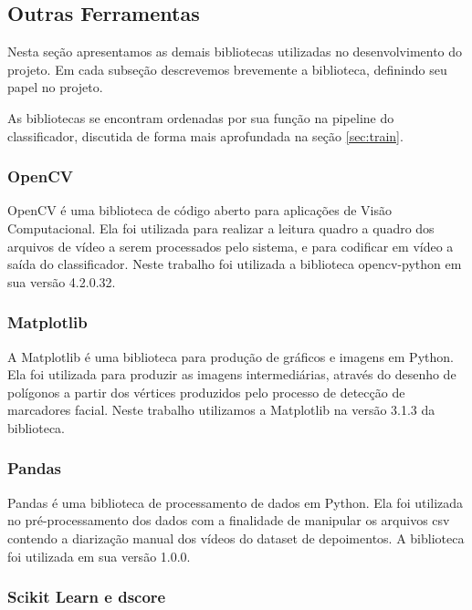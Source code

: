 \subsection{Outras Ferramentas}
\label{subsec:otools}

Nesta seção apresentamos as demais bibliotecas utilizadas no desenvolvimento do projeto. Em cada subseção descrevemos brevemente a biblioteca, definindo seu papel no projeto.

As bibliotecas se encontram ordenadas por sua função na pipeline do classificador, discutida de forma mais aprofundada na seção \ref{sec:train}.

\subsubsection{OpenCV}

OpenCV\cite{opencv_library} é uma biblioteca de código aberto para aplicações de Visão Computacional.
Ela foi utilizada para realizar a leitura quadro a quadro dos arquivos de vídeo a serem processados pelo sistema, e para codificar em vídeo a saída do classificador.
Neste trabalho foi utilizada a biblioteca opencv-python em sua versão 4.2.0.32.

\subsubsection{Matplotlib}

A Matplotlib\cite{hunterMatplotlib2DGraphics2007} é uma biblioteca para produção de gráficos e imagens em Python.
Ela foi utilizada para produzir as imagens intermediárias, através do desenho de polígonos a partir dos vértices produzidos pelo processo de detecção de marcadores facial.
Neste trabalho utilizamos a Matplotlib na versão 3.1.3 da biblioteca.

\subsubsection{Pandas}

Pandas\cite{mckinney-proc-scipy-2010} é uma biblioteca de processamento de dados em Python.
Ela foi utilizada no pré-processamento dos dados com a finalidade de manipular os arquivos csv contendo a diarização manual dos vídeos do dataset de depoimentos.
A biblioteca foi utilizada em sua versão 1.0.0.

\subsubsection{Scikit Learn e dscore}

